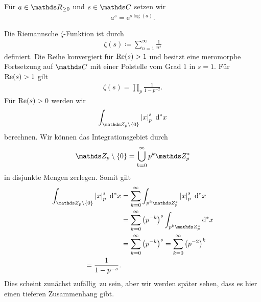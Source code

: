 Für $a \in \R_{\geq 0}$ und $s\in \C$ setzen wir
\begin{align*}
a^s=\mathrm{e}^{s \log(a)}.
\end{align*}

Die Riemannsche $\zeta$-Funktion ist durch
\begin{align*}
\zeta(s)\coloneqq \sum_{n=1}^\infty \frac{1}{n^s}
\end{align*}
definiert.
Die Reihe konvergiert für $\operatorname{Re}(s)>1$ und besitzt eine meromorphe Fortsetzung auf $\C$ mit einer Polstelle vom Grad $1$ in $s=1$.
Für $\operatorname{Re}(s)>1$ gilt
\begin{align*}
\zeta(s)=\prod_p \frac{1}{1-p^{-2}}.
\end{align*}
Für $\operatorname{Re}(s)>0$ werden wir
\begin{align*}
\int_{\Z_p \setminus \{0\}} \abs{x}_p^s ~\mathrm{d}^\ast x
\end{align*}
berechnen.
Wir können das Integrationsgebiet durch
\begin{align*}
\Z_p\setminus \{0\}=\bigcup_{k=0}^\infty p^k \Z_p^\ast
\end{align*}
in disjunkte Mengen zerlegen.
Somit gilt
\begin{align*}
\int_{\Z_p \setminus \{0\}} \abs{x}_p^s ~\mathrm{d}^\ast x&=\sum_{k=0}^\infty \int_{p^k \Z_p^\ast} \abs{x}_p^s ~\mathrm{d}^\ast x\\
&=\sum_{k=0}^\infty \left(p^{-k}\right)^s \int_{p^k \Z_p^\ast}\mathrm{d}^\ast x \\
&=\sum_{k=0}^\infty \left(p^{-k}\right)^s=\sum_{k=0}^\infty \left(p^{-2}\right)^k\\
=\frac{1}{1-p^{-s}}.
\end{align*}
Dies scheint zunächst \glqq zufällig\grqq\, zu sein, aber wir werden später sehen, dass es hier einen tieferen Zusammenhang gibt.